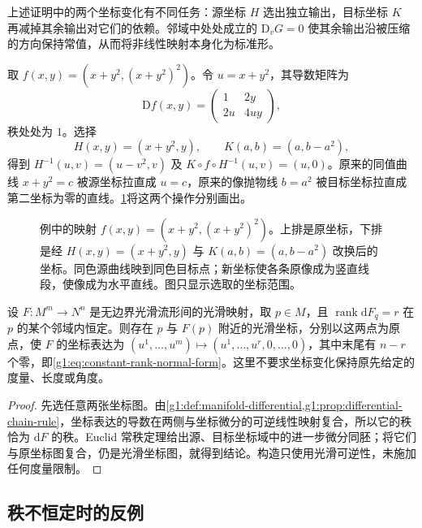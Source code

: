 上述证明中的两个坐标变化有不同任务：源坐标 \(H\) 选出独立输出，目标坐标 \(K\) 再减掉其余输出对它们的依赖。邻域中处处成立的 \(\mathrm{D}_vG=0\) 使其余输出沿被压缩的方向保持常值，从而将非线性映射本身化为标准形。

\begin{example}
	\label{g1:exm:constant-rank-curved-fibres}
	取 \(f(x,y)=(x+y^2,(x+y^2)^2)\)。令 \(u=x+y^2\)，其导数矩阵为
	\[
		\mathrm{D}f(x,y)=\begin{pmatrix}1&2y\\2u&4uy\end{pmatrix},
	\]
	秩处处为 \(1\)。选择
	\[
		H(x,y)=(x+y^2,y),\qquad K(a,b)=(a,b-a^2),
	\]
	得到 \(H^{-1}(u,v)=(u-v^2,v)\) 及 \(K\circ f\circ H^{-1}(u,v)=(u,0)\)。原来的同值曲线 \(x+y^2=c\) 被源坐标拉直成 \(u=c\)，原来的像抛物线 \(b=a^2\) 被目标坐标拉直成第二坐标为零的直线。\cref{g1:fig:constant-rank-coordinates}将这两个操作分别画出。
\end{example}

\begin{figure}[htbp]
	\centering
	
	\caption[常秩坐标如何同时整理原像与像]{例中的映射 \(f(x,y)=(x+y^2,(x+y^2)^2)\)。上排是原坐标，下排是经 \(H(x,y)=(x+y^2,y)\) 与 \(K(a,b)=(a,b-a^2)\) 改换后的坐标。同色源曲线映到同色目标点；新坐标使各条原像成为竖直线段，使像成为水平直线。图只显示选取的坐标范围。}
	\label{g1:fig:constant-rank-coordinates}
\end{figure}

\begin{corollary}
	\label{g1:cor:manifold-constant-rank}
	设 \(F:M^m\to N^n\) 是无边界光滑流形间的光滑映射，取 \(p\in M\)，且 \(\operatorname{rank}\mathrm{d}F_q=r\) 在 \(p\) 的某个邻域内恒定。则存在 \(p\) 与 \(F(p)\) 附近的光滑坐标，分别以这两点为原点，使 \(F\) 的坐标表达为 \((u^1,\ldots,u^m)\mapsto(u^1,\ldots,u^r,0,\ldots,0)\)，其中末尾有 \(n-r\) 个零，即\eqref{g1:eq:constant-rank-normal-form}。这里不要求坐标变化保持原先给定的度量、长度或角度。
\end{corollary}
\begin{proof}
	先选任意两张坐标图。由\cref{g1:def:manifold-differential,g1:prop:differential-chain-rule}，坐标表达的导数在两侧与坐标微分的可逆线性映射复合，所以它的秩恰为 \(\mathrm{d}F\) 的秩。Euclid 常秩定理给出源、目标坐标域中的进一步微分同胚；将它们与原坐标图复合，仍是光滑坐标图，就得到结论。构造只使用光滑可逆性，未施加任何度量限制。
\end{proof}

\subsection{秩不恒定时的反例}
\label{g1:subsec:1103:04}

